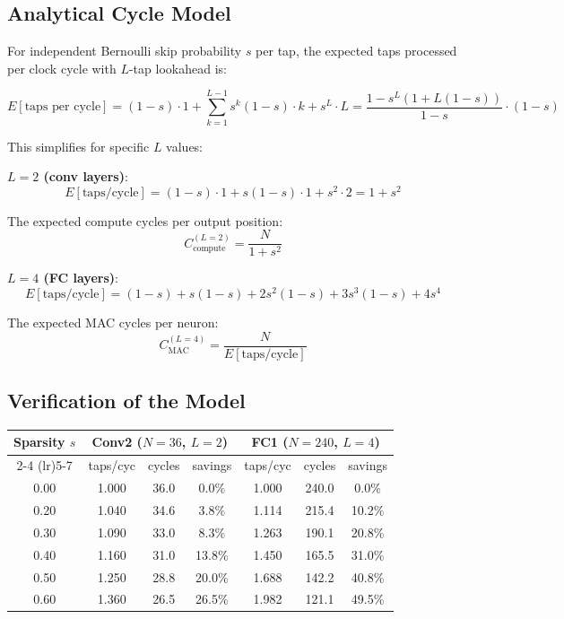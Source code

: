 \documentclass[11pt,a4paper]{article}
\begin{document}
\subsection{Analytical Cycle Model}

For independent Bernoulli skip probability $s$ per tap, the expected taps
processed per clock cycle with $L$-tap lookahead is:

\begin{equation}
\boxed{E[\text{taps per cycle}] = (1-s) \cdot 1 + \sum_{k=1}^{L-1} s^k (1-s) \cdot k + s^L \cdot L = \frac{1 - s^L(1 + L(1-s))}{1-s} \cdot (1-s)}
\end{equation}

\noindent This simplifies for specific $L$ values:

\textbf{$L = 2$ (conv layers)}:
\begin{equation}
E[\text{taps/cycle}] = (1 - s) \cdot 1 + s(1-s) \cdot 1 + s^2 \cdot 2 = 1 + s^2
\end{equation}

The expected compute cycles per output position:
\begin{equation}
\boxed{C_{\text{compute}}^{(L=2)} = \frac{N}{1 + s^2}}
\label{eq:cycles_L2}
\end{equation}

\textbf{$L = 4$ (FC layers)}:
\begin{equation}
E[\text{taps/cycle}] = (1-s) + s(1-s) + 2s^2(1-s) + 3s^3(1-s) + 4s^4
\label{eq:Etaps_L4}
\end{equation}

The expected MAC cycles per neuron:
\begin{equation}
\boxed{C_{\text{MAC}}^{(L=4)} = \frac{N}{E[\text{taps/cycle}]}}
\label{eq:cycles_L4}
\end{equation}

\subsection{Verification of the Model}

\begin{center}
\begin{tabular}{ccccccc}
\toprule
\textbf{Sparsity $s$} & \multicolumn{3}{c}{\textbf{Conv2 ($N=36$, $L=2$)}}
                       & \multicolumn{3}{c}{\textbf{FC1 ($N=240$, $L=4$)}} \\
\cmidrule(lr){2-4} \cmidrule(lr){5-7}
 & taps/cyc & cycles & savings & taps/cyc & cycles & savings \\
\midrule
0.00 & 1.000 & 36.0 & 0.0\% & 1.000 & 240.0 & 0.0\% \\
0.20 & 1.040 & 34.6 & 3.8\% & 1.114 & 215.4 & 10.2\% \\
0.30 & 1.090 & 33.0 & 8.3\% & 1.263 & 190.1 & 20.8\% \\
0.40 & 1.160 & 31.0 & 13.8\% & 1.450 & 165.5 & 31.0\% \\
0.50 & 1.250 & 28.8 & 20.0\% & 1.688 & 142.2 & 40.8\% \\
0.60 & 1.360 & 26.5 & 26.5\% & 1.982 & 121.1 & 49.5\% \\
\bottomrule
\end{tabular}
\end{center}
\end{document}
